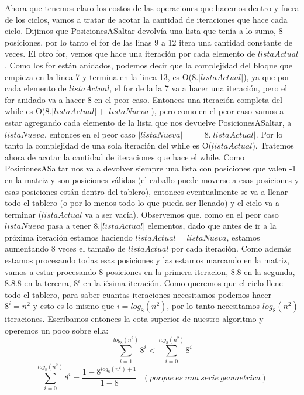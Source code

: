 \documentclass[a4paper]{article}
\begin{document}
\vspace{0.5cm} 
\noindent Ahora que tenemos claro los costos de las operaciones que hacemos dentro y fuera de los ciclos, vamos a tratar de acotar la cantidad de iteraciones que hace cada ciclo.
Dijimos que PosicionesASaltar devolvía una lista que tenía a lo sumo, 8 posiciones, por lo tanto el for de las linas 9 a 12 itera una cantidad constante de veces.
\newline El otro for, vemos que hace una iteración por cada elemento de $listaActual$. Como los for están anidados, podemos decir que la complejidad del bloque que empieza en la linea 7 y termina en la linea 13, es O($8.|listaActual|$), ya que por cada elemento de $listaActual$, el for de la la 7 va a hacer una iteración, pero el for anidado va a hacer 8 en el peor caso. Entonces una iteración completa del while es O($8.|listaActual| + |listaNueva|$), pero como en el peor caso vamos a estar agregando cada elemento de la lista que nos devuelve PosicionesASaltar, a $listaNueva$, entonces en el peor caso $|listaNueva| == 8.|listaActual|$. Por lo tanto la complejidad de una sola iteración del while es O($listaActual$).
\newline Tratemos ahora de acotar la cantidad de iteraciones que hace el while. Como PosicionesASaltar nos va a devolver siempre una lista con posiciones que valen -1 en la matriz y son posiciones válidas (el caballo puede moverse a esas posiciones y esas posiciones están dentro del tablero), entonces eventualmente se va a llenar todo el tablero (o por lo menos todo lo que pueda ser llenado) y el ciclo va a terminar ($listaActual$ va a ser vacía). Observemos que, como en el peor caso $listaNueva$ pasa a tener $8.|listaActual|$ elementos, dado que antes de ir a la próxima iteración estamos haciendo $listaActual = listaNueva$, estamos aumentando 8 veces el tamaño de $listaActual$ por cada iteración. Como además estamos procesando todas esas posiciones y las estamos marcando en la matriz, vamos a estar procesando 8 posiciones en la primera iteracion, $8.8$ en la segunda, $8.8.8$ en la tercera, $8^i$ en la iésima iteración. Como queremos que el ciclo llene todo el tablero, para saber cuantas iteraciones necesitamos podemos hacer $8^i = n^2$ y esto es lo mismo que $i = log_8(n^2)$, por lo tanto necesitamos $log_8(n^2)$ iteraciones. Escribamos entonces la cota superior de nuestro algoritmo y operemos un poco sobre ella:
\newline
\[
\sum_{i=1}^{log_8(n^2)}8^i < \sum_{i=0}^{log_8(n^2)}8^i
\]
\[
\sum_{i=0}^{log_8(n^2)}8^i = \frac{1 - 8^{log_8(n^2) + 1}}{1 - 8} \ \ \ (porque \ es \ una \ serie \ geometrica)
\]
\end{document}
